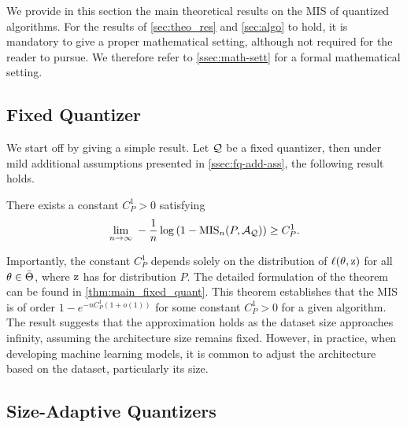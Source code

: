 We provide in this section the main theoretical results on the MIS of quantized algorithms. For the results of \autoref{sec:theo_res} and \autoref{sec:algo} to hold, it is mandatory to give a proper mathematical setting, although not required for the reader to pursue. We therefore refer to \autoref{ssec:math-sett} for a formal mathematical setting.

\subsection{Fixed Quantizer}
We start off by giving a simple result. Let ${\mathcal{Q}}$ be a fixed quantizer, then under mild additional assumptions presented in \autoref{ssec:fq-add-ass}, the following result holds.
\begin{theorem} 
\label{thm:fixed_pos}
There exists a constant $C_P^1 > 0$ satisfying 
\begin{equation}
    \underset{n\to\infty}{\lim}\;-\frac{1}{n}\log\left(1-{\text{MIS}}_n(P, {\mathcal{A}}_{\mathcal{Q}})\right) \geq C_P^1.
\end{equation}
\end{theorem}
Importantly, the constant \( C_P^1 \) depends solely on the distribution of \( \ell(\theta, {\textnormal{z}}) \) for all \( \theta \in \Bar{\Theta} \), where ${\textnormal{z}}$ has for distribution $P$. The detailed formulation of the theorem can be found in \autoref{thm:main_fixed_quant}. This theorem establishes that the MIS is of order \( 1 - e^{-n C_P^1 (1 + o(1))} \) for some constant \( C_P^1 > 0 \) for a given algorithm. The result suggests that the approximation holds as the dataset size approaches infinity, assuming the architecture size remains fixed. However, in practice, when developing machine learning models, it is common to adjust the architecture based on the dataset, particularly its size.




\subsection{Size-Adaptive Quantizers}
\label{subsec:Qn}

